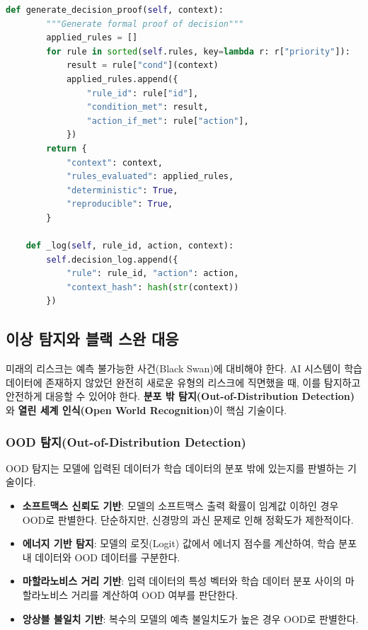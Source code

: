 \begin{lstlisting}[language=Python, caption={뉴로심볼릭 거버넌스 관리자}, label={lst:neuro_sym}]
    def generate_decision_proof(self, context):
        """Generate formal proof of decision"""
        applied_rules = []
        for rule in sorted(self.rules, key=lambda r: r["priority"]):
            result = rule["cond"](context)
            applied_rules.append({
                "rule_id": rule["id"],
                "condition_met": result,
                "action_if_met": rule["action"],
            })
        return {
            "context": context,
            "rules_evaluated": applied_rules,
            "deterministic": True,
            "reproducible": True,
        }

    def _log(self, rule_id, action, context):
        self.decision_log.append({
            "rule": rule_id, "action": action,
            "context_hash": hash(str(context))
        })
\end{lstlisting}

\subsection{이상 탐지와 블랙 스완 대응}
\label{sec:20.1.4}

미래의 리스크는 예측 불가능한 사건(Black Swan)에 대비해야 한다. AI 시스템이 학습 데이터에 존재하지 않았던 완전히 새로운 유형의 리스크에 직면했을 때, 이를 탐지하고 안전하게 대응할 수 있어야 한다. \textbf{분포 밖 탐지(Out-of-Distribution Detection)}와 \textbf{열린 세계 인식(Open World Recognition)}이 핵심 기술이다.

\subsubsection{OOD 탐지(Out-of-Distribution Detection)}

OOD 탐지는 모델에 입력된 데이터가 학습 데이터의 분포 밖에 있는지를 판별하는 기술이다.

\begin{itemize}
 \item \textbf{소프트맥스 신뢰도 기반}: 모델의 소프트맥스 출력 확률이 임계값 이하인 경우 OOD로 판별한다. 단순하지만, 신경망의 과신 문제로 인해 정확도가 제한적이다.
 \item \textbf{에너지 기반 탐지}: 모델의 로짓(Logit) 값에서 에너지 점수를 계산하여, 학습 분포 내 데이터와 OOD 데이터를 구분한다.
 \item \textbf{마할라노비스 거리 기반}: 입력 데이터의 특성 벡터와 학습 데이터 분포 사이의 마할라노비스 거리를 계산하여 OOD 여부를 판단한다.
 \item \textbf{앙상블 불일치 기반}: 복수의 모델의 예측 불일치도가 높은 경우 OOD로 판별한다.
\end{itemize}

